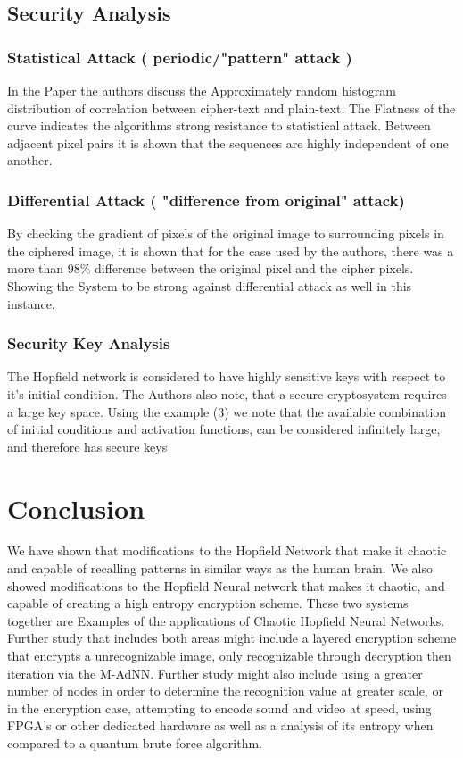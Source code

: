 \documentclass[12pt, letterpaper]{article}
\begin{document}
\subsection*{Security Analysis}
\subsubsection*{Statistical Attack ( periodic/"pattern" attack )}
In the Paper the authors discuss the Approximately random histogram distribution of correlation between cipher-text and plain-text. The Flatness of the curve indicates the algorithms strong resistance to statistical attack. Between adjacent pixel pairs it is shown that the sequences are highly independent of one another.
\subsubsection*{Differential Attack ( "difference from original" attack) }
By checking the gradient of pixels of the original image to surrounding pixels in the ciphered image, it is shown that for the case used by the authors, there was a more than 98\% difference between the original pixel and the cipher pixels. Showing the System to be strong against differential attack as well in this instance. 
\subsubsection*{Security Key Analysis}
The Hopfield network is considered to have highly sensitive keys with respect to it's initial condition. The Authors also note, that a secure cryptosystem requires a large key space. Using the example (3) we note that the available combination of initial conditions and activation functions,  can be considered infinitely large, and therefore has secure keys


\section*{Conclusion}

We have shown that modifications to the Hopfield Network that make it chaotic and capable of recalling patterns in similar ways as the human brain.  We also showed modifications to the Hopfield Neural network that makes it chaotic, and capable of creating a high entropy encryption scheme. These two systems together are Examples of the applications of Chaotic Hopfield Neural Networks. Further study that includes both areas might include a layered encryption scheme that encrypts a unrecognizable image, only recognizable through decryption then iteration via the M-AdNN. Further study might also include using a greater number of nodes in order to determine the recognition value at greater scale, or in the encryption case, attempting to encode sound and video at speed, using FPGA's or other dedicated hardware as well as a analysis of its entropy when compared to a quantum brute force algorithm. 
\end{document}
